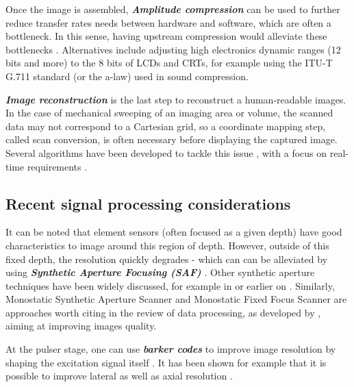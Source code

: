 \documentclass{article}
\begin{document}
Once the image is assembled, \textbf{\textit{Amplitude compression}} can be used to further reduce  transfer rates needs between hardware and software, which are often a bottleneck. In this sense, having upstream compression would alleviate these bottlenecks \cite{soto-cajiga_fpga-based_2012, akkala_fpga_2014}. Alternatives \cite{akkala_compression_2014, boonleelakul_compression_2013} include  adjusting high electronics dynamic ranges (12 bits and more) to the 8 bits of LCDs and CRTs, for example using the ITU-T G.711 standard (or the a-law) used in sound compression.

\textbf{\textit{Image reconstruction}} is the last step to reconstruct a human-readable images. In the case of mechanical sweeping of an imaging area or volume, the scanned data may not correspond to a Cartesian grid, so a coordinate mapping step, called scan conversion, is often necessary before displaying the captured image.
Several algorithms have been developed to tackle this issue \cite{ophir_digital_1979}, with a focus on real-time requirements \cite{csany_real-time_2019}.

\subsection{Recent signal processing considerations}



It can be noted that element sensors (often focused as a given depth) have good characteristics to image around this region of depth. However, outside of this fixed depth, the resolution quickly degrades - which can can be alleviated by using \textbf{\textit{Synthetic Aperture Focusing (SAF)}}  \cite{andresen_synthetic_2011, assef_flexible_2015, li_initial_2018, lewandowski_low-cost_2012, zhang_synthetic_2016}. Other synthetic aperture techniques have been widely discussed, for example in \cite{gunarathne_strategies_2013, jeon_novel_2019} or earlier on \cite{burckhardt_experimental_1974}. Similarly, Monostatic Synthetic Aperture Scanner and Monostatic Fixed Focus Scanner are approaches worth citing in the review of data processing, as developed by \cite{bottenus_implementation_2015, ylitalo_ultrasound_1994,heuvel_development_2017, nikolov_fast_2008}, aiming at improving images quality.  

At the pulser stage, one can use \textbf{\textit{barker codes}}  \cite{zhang_evaluation_2019,wang_research_2021} to  improve image resolution by shaping the excitation signal itself \cite{isla_coded_2017}. It has been shown for example that it is possible to improve lateral as well as axial resolution  \cite{fujita_effect_2017, chun_ultrasound_2015, kim_real-time_2018}.
\end{document}
